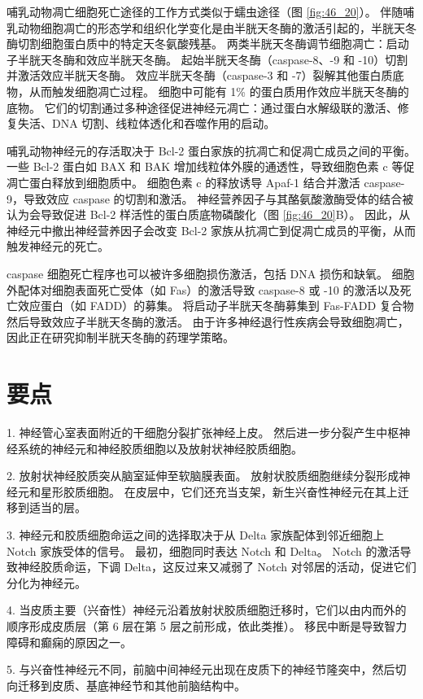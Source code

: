 哺乳动物凋亡细胞死亡途径的工作方式类似于蠕虫途径（图 \ref{fig:46_20}）。 伴随哺乳动物细胞凋亡的形态学和组织化学变化是由半胱天冬酶的激活引起的，半胱天冬酶切割细胞蛋白质中的特定天冬氨酸残基。 两类半胱天冬酶调节细胞凋亡：启动子半胱天冬酶和效应半胱天冬酶。 起始半胱天冬酶（caspase-8、-9 和 -10）切割并激活效应半胱天冬酶。 效应半胱天冬酶（caspase-3 和 -7）裂解其他蛋白质底物，从而触发细胞凋亡过程。 细胞中可能有 1\% 的蛋白质用作效应半胱天冬酶的底物。 它们的切割通过多种途径促进神经元凋亡：通过蛋白水解级联的激活、修复失活、DNA 切割、线粒体透化和吞噬作用的启动。

哺乳动物神经元的存活取决于 Bcl-2 蛋白家族的抗凋亡和促凋亡成员之间的平衡。 一些 Bcl-2 蛋白如 BAX 和 BAK 增加线粒体外膜的通透性，导致细胞色素 c 等促凋亡蛋白释放到细胞质中。 细胞色素 c 的释放诱导 Apaf-1 结合并激活 caspase-9，导致效应 caspase 的切割和激活。 神经营养因子与其酪氨酸激酶受体的结合被认为会导致促进 Bcl-2 样活性的蛋白质底物磷酸化（图 \ref{fig:46_20}B）。 因此，从神经元中撤出神经营养因子会改变 Bcl-2 家族从抗凋亡到促凋亡成员的平衡，从而触发神经元的死亡。

caspase 细胞死亡程序也可以被许多细胞损伤激活，包括 DNA 损伤和缺氧。 细胞外配体对细胞表面死亡受体（如 Fas）的激活导致 caspase-8 或 -10 的激活以及死亡效应蛋白（如 FADD）的募集。 将启动子半胱天冬酶募集到 Fas-FADD 复合物然后导致效应子半胱天冬酶的激活。 由于许多神经退行性疾病会导致细胞凋亡，因此正在研究抑制半胱天冬酶的药理学策略。


\section{要点}
1. 神经管心室表面附近的干细胞分裂扩张神经上皮。 然后进一步分裂产生中枢神经系统的神经元和神经胶质细胞以及放射状神经胶质细胞。 

2. 放射状神经胶质突从脑室延伸至软脑膜表面。 放射状胶质细胞继续分裂形成神经元和星形胶质细胞。 在皮层中，它们还充当支架，新生兴奋性神经元在其上迁移到适当的层。 

3. 神经元和胶质细胞命运之间的选择取决于从 Delta 家族配体到邻近细胞上 Notch 家族受体的信号。 最初，细胞同时表达 Notch 和 Delta。 Notch 的激活导致神经胶质命运，下调 Delta，这反过来又减弱了 Notch 对邻居的活动，促进它们分化为神经元。 

4. 当皮质主要（兴奋性）神经元沿着放射状胶质细胞迁移时，它们以由内而外的顺序形成皮质层（第 6 层在第 5 层之前形成，依此类推）。 移民中断是导致智力障碍和癫痫的原因之一。 

5. 与兴奋性神经元不同，前脑中间神经元出现在皮质下的神经节隆突中，然后切向迁移到皮质、基底神经节和其他前脑结构中。 

